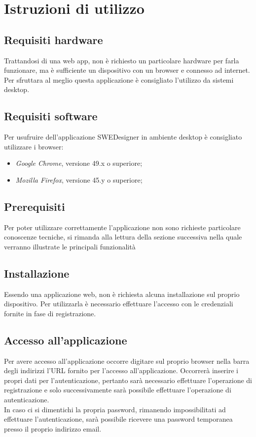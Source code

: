 \section{Istruzioni di utilizzo}
\subsection{Requisiti hardware}
Trattandosi di una web app, non è richiesto un particolare hardware per farla funzionare, ma è sufficiente un dispositivo con un browser e connesso ad internet. Per sfruttara al meglio questa applicazione è consigliato l'utilizzo da sistemi desktop.

\subsection{Requisiti software}
Per usufruire dell'applicazione SWEDesigner in ambiente desktop è consigliato utilizzare i browser:
\begin{itemize}
\item \emph{Google Chrome}, versione 49.x o superiore;
\item \emph{Mozilla Firefox}, versione 45.y o superiore;
\end{itemize}

\subsection{Prerequisiti}
Per poter utilizzare correttamente l'applicazione non sono richieste particolare conoscenze tecniche, si rimanda alla lettura della sezione successiva nella quale verranno illustrate le principali funzionalità

\subsection{Installazione}
Essendo una applicazione web, non è richiesta alcuna installazione sul proprio dispositivo. Per utilizzarla è necessario effettuare l'accesso con le credenziali fornite in fase di registrazione.

\subsection{Accesso all'applicazione}
Per avere accesso all'applicazione occorre digitare sul proprio browser nella barra degli indirizzi l'URL fornito per l'accesso all'applicazione. Occorrerà inserire i propri dati per l'autenticazione, pertanto sarà necessario effettuare l'operazione di registrazione e solo successivamente sarà possibile effettuare l'operazione di autenticazione.\\
In caso ci si dimentichi la propria password, rimanendo impossibilitati ad effettuare l'autenticazione, sarà possibile ricevere una password temporanea presso il proprio indirizzo email.

